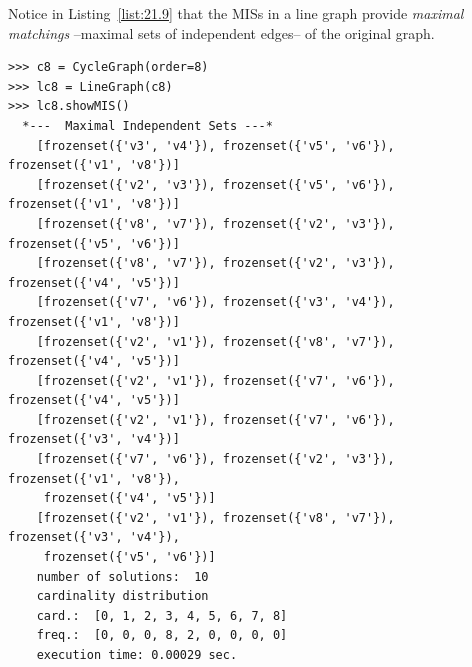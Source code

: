 Notice in Listing~\vref{list:21.9} that the MISs in a line graph provide \emph{maximal matchings} --maximal sets of independent edges-- of the original graph.
\begin{lstlisting}[caption={Computing the MISs of the line graph of the 8-cycle graph},label=list:21.9,basicstyle=\ttfamily\scriptsize]
>>> c8 = CycleGraph(order=8)
>>> lc8 = LineGraph(c8)
>>> lc8.showMIS()
  *---  Maximal Independent Sets ---*
    [frozenset({'v3', 'v4'}), frozenset({'v5', 'v6'}), frozenset({'v1', 'v8'})]
    [frozenset({'v2', 'v3'}), frozenset({'v5', 'v6'}), frozenset({'v1', 'v8'})]
    [frozenset({'v8', 'v7'}), frozenset({'v2', 'v3'}), frozenset({'v5', 'v6'})]
    [frozenset({'v8', 'v7'}), frozenset({'v2', 'v3'}), frozenset({'v4', 'v5'})]
    [frozenset({'v7', 'v6'}), frozenset({'v3', 'v4'}), frozenset({'v1', 'v8'})]
    [frozenset({'v2', 'v1'}), frozenset({'v8', 'v7'}), frozenset({'v4', 'v5'})]
    [frozenset({'v2', 'v1'}), frozenset({'v7', 'v6'}), frozenset({'v4', 'v5'})]
    [frozenset({'v2', 'v1'}), frozenset({'v7', 'v6'}), frozenset({'v3', 'v4'})]
    [frozenset({'v7', 'v6'}), frozenset({'v2', 'v3'}), frozenset({'v1', 'v8'}),
     frozenset({'v4', 'v5'})]
    [frozenset({'v2', 'v1'}), frozenset({'v8', 'v7'}), frozenset({'v3', 'v4'}),
     frozenset({'v5', 'v6'})]
    number of solutions:  10
    cardinality distribution
    card.:  [0, 1, 2, 3, 4, 5, 6, 7, 8]
    freq.:  [0, 0, 0, 8, 2, 0, 0, 0, 0]
    execution time: 0.00029 sec.
\end{lstlisting}

